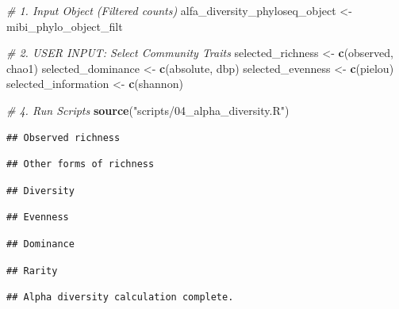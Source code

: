 \documentclass[
]{article}
\newenvironment{Shaded}{\begin{snugshade}}{\end{snugshade}}
\newcommand{\CommentTok}[1]{\textcolor[rgb]{0.56,0.35,0.01}{\textit{#1}}}
\newcommand{\FunctionTok}[1]{\textcolor[rgb]{0.13,0.29,0.53}{\textbf{#1}}}
\newcommand{\NormalTok}[1]{#1}
\newcommand{\OtherTok}[1]{\textcolor[rgb]{0.56,0.35,0.01}{#1}}
\newcommand{\StringTok}[1]{\textcolor[rgb]{0.31,0.60,0.02}{#1}}
\begin{document}
\begin{Shaded}
\begin{Highlighting}[]
\CommentTok{\# 1. Input Object (Filtered counts)}
\NormalTok{alfa\_diversity\_phyloseq\_object }\OtherTok{\textless{}{-}}\NormalTok{ mibi\_phylo\_object\_filt}

\CommentTok{\# 2. USER INPUT: Select Community Traits}
\NormalTok{selected\_richness    }\OtherTok{\textless{}{-}} \FunctionTok{c}\NormalTok{(}\StringTok{\textquotesingle{}observed\textquotesingle{}}\NormalTok{, }\StringTok{\textquotesingle{}chao1\textquotesingle{}}\NormalTok{) }
\NormalTok{selected\_dominance   }\OtherTok{\textless{}{-}} \FunctionTok{c}\NormalTok{(}\StringTok{\textquotesingle{}absolute\textquotesingle{}}\NormalTok{, }\StringTok{\textquotesingle{}dbp\textquotesingle{}}\NormalTok{) }
\NormalTok{selected\_evenness    }\OtherTok{\textless{}{-}} \FunctionTok{c}\NormalTok{(}\StringTok{\textquotesingle{}pielou\textquotesingle{}}\NormalTok{)}
\NormalTok{selected\_information }\OtherTok{\textless{}{-}} \FunctionTok{c}\NormalTok{(}\StringTok{\textquotesingle{}shannon\textquotesingle{}}\NormalTok{) }

\CommentTok{\# 4. Run Scripts}
\FunctionTok{source}\NormalTok{(}\StringTok{"scripts/04\_alpha\_diversity.R"}\NormalTok{)}
\end{Highlighting}
\end{Shaded}

\begin{verbatim}
## Observed richness
\end{verbatim}

\begin{verbatim}
## Other forms of richness
\end{verbatim}

\begin{verbatim}
## Diversity
\end{verbatim}

\begin{verbatim}
## Evenness
\end{verbatim}

\begin{verbatim}
## Dominance
\end{verbatim}

\begin{verbatim}
## Rarity
\end{verbatim}

\begin{verbatim}
## Alpha diversity calculation complete.
\end{verbatim}
\end{document}
